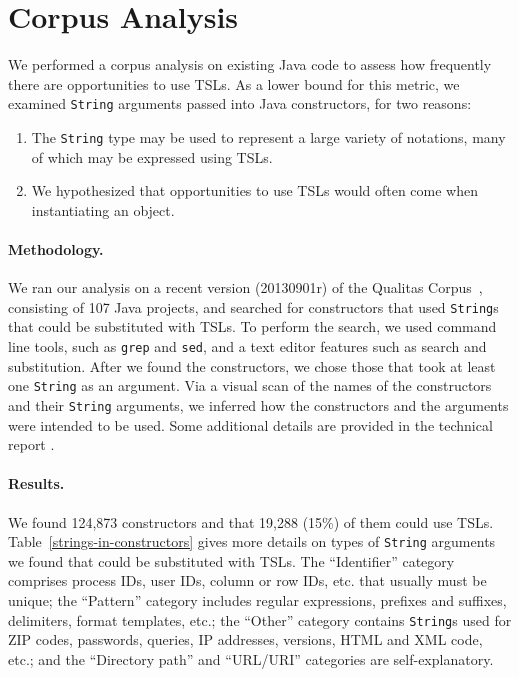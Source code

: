 
\section{Corpus Analysis}
\label{s:study}

We performed a corpus analysis on existing Java code to assess how frequently there are opportunities to use TSLs. As a lower bound for this metric, we examined \lstinline{String} arguments passed into Java constructors, for two reasons:

\begin{enumerate}
\item The \lstinline{String} type may be used to represent a large variety of notations, many of which may be expressed using TSLs.
\item We hypothesized that opportunities to use TSLs would often come when instantiating an object.
\end{enumerate}

\paragraph{Methodology.} We ran our analysis on a recent version (20130901r) of the Qualitas Corpus~\cite{QualitasCorpus:APSEC:2010}, consisting of 107 Java projects, and searched for constructors that used \lstinline{String}s that could be substituted with TSLs. To perform the search, we used command line tools, such as \lstinline{grep} and \lstinline{sed}, and a text editor features such as search and substitution. After we found the constructors, we chose those that took at least one \lstinline{String} as an argument. Via a visual scan of the names of the constructors and their \lstinline{String} arguments, we inferred how the constructors and the arguments were intended to be used. Some additional details are provided in the technical report \cite{TR}.

\paragraph{Results.} We found 124,873 constructors and that 19,288 (15\%) of them could use TSLs. Table~\ref{strings-in-constructors} gives more details on types of \lstinline{String} arguments we found that could be substituted with TSLs. The ``Identifier'' category comprises process IDs, user IDs, column or row IDs, etc. that usually must be unique; the ``Pattern'' category includes regular expressions, prefixes and suffixes, delimiters, format templates, etc.; the ``Other'' category contains \lstinline{String}s used for ZIP codes, passwords, queries, IP addresses, versions, HTML and XML code, etc.; and the ``Directory path'' and ``URL/URI'' categories are self-explanatory.


